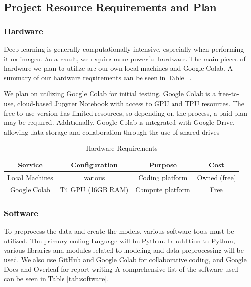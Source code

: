 \documentclass[stu,12pt,floatsintext]{apa7}
\begin{document}
\subsection{Project Resource Requirements and Plan}
\subsubsection{Hardware}
Deep learning is generally computationally intensive, especially when performing it on images. As a result, we require more powerful hardware. The main pieces of hardware we plan to utilize are our own local machines and Google Colab. A summary of our hardware requirements can be seen in Table \ref{tab:hardware}.

We plan on utilizing Google Colab for initial testing. Google Colab is a free-to-use, cloud-based Jupyter Notebook with access to GPU and TPU resources. The free-to-use version has limited resources, so depending on the process, a paid plan may be required. Additionally, Google Colab is integrated with Google Drive, allowing data storage and collaboration through the use of shared drives.

\begin{table}[!htb]
    \centering
    \caption{Hardware Requirements}
    \begin{tabular}{cccc}
    \hline
         Service& Configuration & Purpose & Cost \\ 
         \hline
         Local Machines & various & Coding platform & Owned (free)\\
         Google Colab & T4 GPU (16GB RAM) & Compute platform & Free \\
         \hline
    \end{tabular}
    \label{tab:hardware}
\end{table}

\subsubsection{Software}
To preprocess the data and create the models, various software tools must be utilized. The primary coding language will be Python. In addition to Python, various libraries and modules related to modeling and data preprocessing will be used. We also use GitHub and Google Colab for collaborative coding, and Google Docs and Overleaf for report writing A comprehensive list of the software used can be seen in Table \ref{tab:software}.
\end{document}
